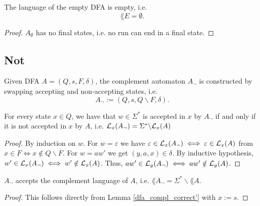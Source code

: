 \begin{lemma}
    \label{dfa_empty_correct}
    The language of the empty DFA is empty, i.e.
    \begin{equation*}
        \lang{E} = \emptyset.
    \end{equation*}
\end{lemma}

\begin{proof}
    $A_\emptyset$ has no final states, i.e. no run can end in a final state.
\end{proof}




\subsection{Not}
\begin{definition}
    Given DFA $A=(Q,s,F,\delta)$, the complement automaton $A_\neg$ is constructed by swapping accepting and non-accepting states, i.e.
    \begin{equation*}
       A_\neg := (Q,s,Q\backslash F,\delta). 
    \end{equation*}
\end{definition}

\begin{lemma}
    \label{dfa_compl_correct'}
    For every state $x \in Q$, we have that $w \in \Sigma^*$ is accepted in $x$ by $A_\neg$ if and only if it is not accepted in $x$ by $A$, i.e. $\mathcal{L}_{x}(A_\neg) = \Sigma^* \backslash \mathcal{L}_{x}(A)$ 
\end{lemma}
\begin{proof}
    By induction on $w$.
    For $w = \varepsilon$ we have $\varepsilon \in \mathcal{L}_{x}(A_\neg) \iff \varepsilon \in \mathcal{L}_{x}(A)$ from
    $x \in F \iff x \notin Q\backslash F$.
    For $w = aw'$ we get $(y,a,x) \in \delta$. 
    By inductive hypothesis, $w' \in \mathcal{L}_{x}(A_\neg) \iff w' \notin \mathcal{L}_{x}(A)$.
    Thus, $aw' \in \mathcal{L}_{y}(A_\neg) \iff aw' \notin \mathcal{L}_{y}(A)$.
\end{proof}
\begin{lemma}
    $A_\neg$ accepts the complement language of $A$, i.e. $\lang{A_\neg} = \Sigma^* \backslash \lang{A}$.
    \label{dfa_compl_correct}
\end{lemma}
\begin{proof}
    This follows directly from Lemma \ref{dfa_compl_correct'} with $x := s$.
\end{proof}


